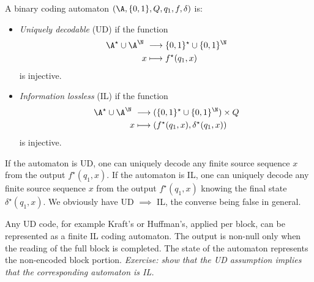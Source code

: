 \documentclass[toc, titlepaged]{../cs-classes/cs-classes}
\begin{document}
\begin{definition}
    A binary coding automaton $(\A, \{0, 1\}, Q, q_1, f, \delta)$ is:
    \begin{itemize}
        \item \emph{Uniquely decodable} (UD) if the function
        \begin{equation*}
            \begin{aligned}
               \A^\star \cup \A^\N &\longrightarrow \{0, 1\}^\star \cup \{0, 1\}^\N\\
                x &\longmapsto f^\star(q_1, x)
            \end{aligned}
        \end{equation*}
        is injective.
        \item \emph{Information lossless} (IL) if the function
        \begin{equation*}
            \begin{aligned}
                \A^\star \cup \A^\N &\longrightarrow (\{0, 1\}^\star \cup \{0, 1\}^\N) \times Q\\
                x &\longmapsto (f^\star(q_1, x), \delta^\star(q_1, x))
            \end{aligned}
        \end{equation*}
        is injective.
    \end{itemize}
\end{definition}

\begin{remark}
    If the automaton is UD, one can uniquely decode any finite source sequence $x$ from the output $f^\star(q_1, x)$. If the automaton is IL, one can uniquely decode any finite source sequence $x$ from the output $f^\star(q_1, x)$ knowing the final state $\delta^\star(q_1, x)$. We obviously have UD $\implies$ IL, the converse being false in general.
\end{remark}

\begin{example}
    Any UD code, for example Kraft's or Huffman's, applied per block, can be represented as a finite IL coding automaton. The output is non-null only when the reading of the full block is completed. The state of the automaton represents the non-encoded block portion. \emph{Exercise: show that the UD assumption implies that the corresponding automaton is IL.}
\end{example}
\end{document}
